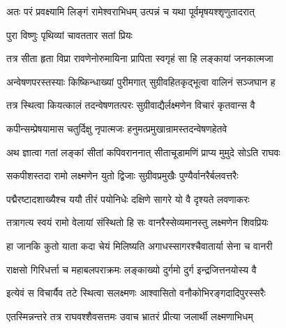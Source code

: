 


\storymeta


\twolineshloka
{अतः परं प्रवक्ष्यामि लिङ्गं रामेश्वराभिधम्} 
{उत्पन्नं च यथा पूर्वमृषयश्शृणुतादरात्}

\onelineshloka
{पुरा विष्णुः पृथिव्यां चावततार सतां प्रियः} %

\twolineshloka
{तत्र सीता हृता विप्रा रावणेनोरुमायिना} 
{प्रापिता स्वगृहं सा हि लङ्कायां जनकात्मजा} %

\twolineshloka
{अन्वेषणपरस्तस्याः किष्किन्धाख्यां पुरीमगात्} 
{सुग्रीवहितकृद्भूत्वा वालिनं सञ्जघान ह} %

\twolineshloka
{तत्र स्थित्वा कियत्कालं तदन्वेषणतत्परः} 
{सुग्रीवाद्यैर्लक्ष्मणेन विचारं कृतवान्स वै} %

\twolineshloka
{कपीन्सम्प्रेषयामास चतुर्दिक्षु नृपात्मजः} 
{हनुमत्प्रमुखान्रामस्तदन्वेषणहेतवे} %

\twolineshloka
{अथ ज्ञात्वा गतां लङ्कां सीतां कपिवराननात्} 
{सीताचूडामणिं प्राप्य मुमुदे सोऽति राघवः} %

\twolineshloka
{सकपीशस्तदा रामो लक्ष्मणेन युतो द्विजाः} 
{सुग्रीवप्रमुखैः पुण्यैर्वानरैर्बलवत्तरैः} %

\twolineshloka
{पद्मैरष्टादशाख्यैश्च ययौ तीरं पयोनिधेः}
{दक्षिणे सागरे यो वै दृश्यते लवणाकरः}

\twolineshloka
{तत्रागत्य स्वयं रामो वेलायां संस्थितो हि सः} 
{वानरैस्सेव्यमानस्तु लक्ष्मणेन शिवप्रियः} %

\twolineshloka
{हा जानकि कुतो याता कदा चेयं मिलिष्यति} 
{अगाधस्सागरश्चैवातार्या सेना च वानरी} %

\twolineshloka
{राक्षसो गिरिधर्त्ता च महाबलपराक्रमः}
{लङ्काख्यो दुर्गमो दुर्ग इन्द्रजित्तनयोस्य वै} %

\twolineshloka
{इत्येवं स विचार्यैव तटे स्थित्वा सलक्ष्मणः}
{आश्वासितो वनौकोभिरङ्गदादिपुरस्सरैः} %

\twolineshloka
{एतस्मिन्नन्तरे तत्र राघवश्शैवसत्तमः}
{उवाच भ्रातरं प्रीत्या जलार्थी लक्ष्मणाभिधम्} %


